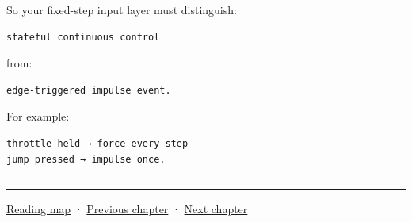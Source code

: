 So your fixed-step input layer must distinguish:

\begin{verbatim}
stateful continuous control
\end{verbatim}

from:

\begin{verbatim}
edge-triggered impulse event.
\end{verbatim}

For example:

\begin{verbatim}
throttle held → force every step
jump pressed → impulse once.
\end{verbatim}

\begin{center}\rule{0.5\linewidth}{0.5pt}\end{center}

\begin{center}\rule{0.5\linewidth}{0.5pt}\end{center}

\hyperref[volume-reading-map]{Reading map} · \hyperref[06-engine-ii-ch036-auditing-capsule-mass-properties-and-collision-formulas]{Previous chapter} · \hyperref[06-engine-ii-ch038-integrator-choices-and-energy-drift]{Next chapter}
